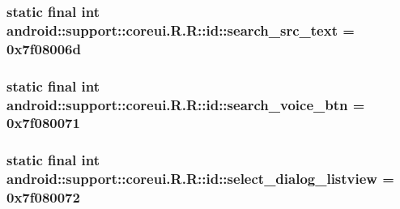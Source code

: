 \hypertarget{classandroid_1_1support_1_1coreui_1_1_r_1_1id_aa88100ec7020cb0341b7c6cd00709d6}{
\subsubsection[{search\_\-src\_\-text}]{\setlength{\rightskip}{0pt plus 5cm}static final int android::support::coreui.R.R::id::search\_\-src\_\-text = 0x7f08006d}}
\label{classandroid_1_1support_1_1coreui_1_1_r_1_1id_aa88100ec7020cb0341b7c6cd00709d6}


\hypertarget{classandroid_1_1support_1_1coreui_1_1_r_1_1id_344635ae758f535096a402001e748d0d}{
\subsubsection[{search\_\-voice\_\-btn}]{\setlength{\rightskip}{0pt plus 5cm}static final int android::support::coreui.R.R::id::search\_\-voice\_\-btn = 0x7f080071}}
\label{classandroid_1_1support_1_1coreui_1_1_r_1_1id_344635ae758f535096a402001e748d0d}


\hypertarget{classandroid_1_1support_1_1coreui_1_1_r_1_1id_cf2207cff0208370ac9b17d1f18d73d0}{
\subsubsection[{select\_\-dialog\_\-listview}]{\setlength{\rightskip}{0pt plus 5cm}static final int android::support::coreui.R.R::id::select\_\-dialog\_\-listview = 0x7f080072}}
\label{classandroid_1_1support_1_1coreui_1_1_r_1_1id_cf2207cff0208370ac9b17d1f18d73d0}


